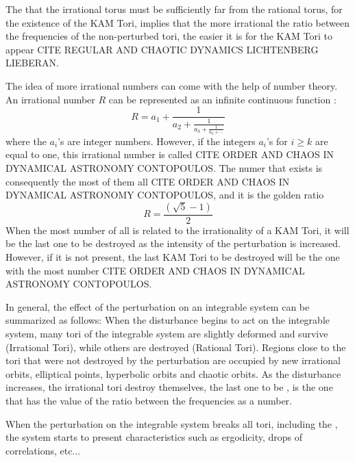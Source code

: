 The that the irrational torus must be sufficiently far from the rational torus, for the existence of the KAM Tori, implies that the more irrational the ratio between the frequencies of the non-perturbed tori, the easier it is for the KAM Tori to appear CITE REGULAR AND CHAOTIC DYNAMICS LICHTENBERG LIEBERAN.\par

The idea of more irrational numbers can come with the help of number theory. An irrational number $R$ can  be represented as an infinite continuous function \cite{ottChaosDynamicalSystems2002}:
\begin{equation}
R=a_1+\frac{1}{a_2+\frac{1}{a_3+\frac{1}{a_3+ \cdots}}}
\end{equation}
where the $a_i$'s are integer numbers. However, if the integers $a_i$'s for $i\geq k$ are equal to one, this irrational number is called  CITE ORDER AND CHAOS IN DYNAMICAL ASTRONOMY CONTOPOULOS. The  numer that exists is consequently the most  of them all CITE ORDER AND CHAOS IN DYNAMICAL ASTRONOMY CONTOPOULOS, and it is the golden ratio
\begin{equation}
R=\frac{(\sqrt{5}-1)}{2}
\end{equation}
When the most  number of all is related to the irrationality of a KAM Tori, it will be the last one to be destroyed as the intensity of the perturbation is increased. However, if it is not present, the last KAM Tori to be destroyed will be the one with the most  number CITE ORDER AND CHAOS IN DYNAMICAL ASTRONOMY CONTOPOULOS.\par

In general, the effect of the perturbation on an integrable system can be summarized as follows: When the disturbance begins to act on the integrable system, many tori of the integrable system are slightly deformed and survive (Irrational Tori), while others are destroyed (Rational Tori). Regions close to the tori that were not destroyed by the perturbation are occupied by new irrational orbits, elliptical points, hyperbolic orbits and chaotic orbits. As the disturbance increases, the irrational tori destroy themselves, the last one to be , is the one that has the value of the ratio between the frequencies as a  number.\par

When the perturbation on the integrable system breaks all tori, including the , the system starts to present characteristics such as ergodicity, drops of correlations, etc...



